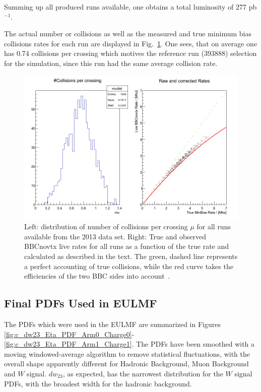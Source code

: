 Summing up all produced runs available, one obtains a total luminosity of 277
pb$^{-1}$. 

The actual number or collisions as well as the measured and true minimum bias
collisions rates for each run are displayed in Fig.~\ref{fig:bbc_mc}. One sees,
that on average one has 0.74 collisions per crossing which motives the reference
run (393888) selection for the simulation, since this run had the same average
collision rate.

\begin{figure}
  \centering
  \includegraphics[width=0.9\linewidth]{./figures/BBCrawcorrrates2.png}
  \caption{
    Left: distribution of number of collisions per crossing $\mu$ for all runs
    available from the  2013 data set. Right: True and observed BBCnovtx live
    rates for all runs as a function of the true rate and calculated as
    described in the text. The green, dashed line represents a perfect
    accounting of true collisions, while the red curve takes the efficiencies of
    the two BBC sides into account~\cite{Seidl2014a}.
  }
  \label{fig:bbc_mc}
\end{figure}

\clearpage
\subsection{Final PDFs Used in EULMF}

The PDFs which were used in the EULMF are summarized in Figures
\ref{fig:c_dw23_Eta_PDF_Arm0_Charge0}-\ref{fig:c_dw23_Eta_PDF_Arm1_Charge1}. The
PDFs have been smoothed with a moving windowed-average algorithm to remove
statistical fluctuations, with the overall shape apparently different for
Hadronic Background, Muon Background and $W$ signal. $dw_{23}$, as expected, has
the narrowest distribution for the $W$ signal PDFs, with the broadest width for
the hadronic background. 

